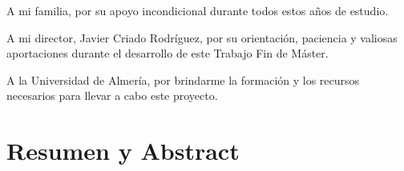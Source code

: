 \documentclass[11pt, oneside]{book}
\author{Alex César Taquila Camasca}
\begin{document}
\frontmatter

\portada
\begin{dedicatoria}

A mi familia, por su apoyo incondicional durante todos estos años de estudio.

A mi director, Javier Criado Rodríguez, por su orientación, paciencia y valiosas aportaciones durante el desarrollo de este Trabajo Fin de Máster.

A la Universidad de Almería, por brindarme la formación y los recursos necesarios para llevar a cabo este proyecto.

\end{dedicatoria}





\chapter*{Resumen y Abstract}




\mainmatter
\marcagua





















 \cleardoublepage

 

\appendix




 \clearpage
 \backmatter

\end{document}
